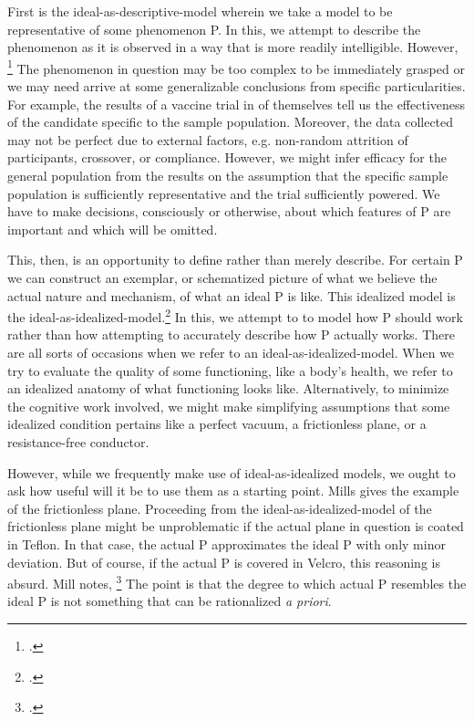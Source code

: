 \documentclass[letterpaper,notitlepage,12pt]{article}
\begin{document}
First is the ideal-as-descriptive-model wherein we take a model to be
representative of some phenomenon P.
In this, we attempt to describe the phenomenon as it is observed in a 
way that is more readily intelligible.
However, \footcite[p. 166]{mills_ideal_2005}
The phenomenon in question may be too complex to be immediately grasped or we
may need arrive at some generalizable conclusions from specific
particularities.
For example, the results of a vaccine trial in of themselves tell us the 
effectiveness of the candidate specific to the sample population.
Moreover, the data collected may not be perfect due to external factors, e.g.
non-random attrition of participants, crossover, or compliance.
However, we might infer efficacy for the general population from the results 
on the assumption that the specific sample population is sufficiently
representative and the trial sufficiently powered.
We have to make decisions, consciously or otherwise, about which 
features of P are important and which will be omitted. 

This, then, is an opportunity to define rather than merely describe.
For certain P we can construct an exemplar, or schematized picture of what we
believe the actual nature and mechanism, of what an ideal P is like.
This idealized model is the ideal-as-idealized-model.\footcite[p. 167
]{mills_ideal_2005}
In this, we attempt to to model how P should work rather than how attempting to
accurately describe how P actually works.
There are all sorts of occasions when we refer to an ideal-as-idealized-model.
When we try to evaluate the quality of some functioning, like a body's health,
we refer to an idealized anatomy of what  functioning looks
like.
Alternatively, to minimize the cognitive work involved, we might make
simplifying assumptions that some idealized condition pertains like a perfect
vacuum, a frictionless plane, or a resistance-free conductor.

However, while we frequently make use of ideal-as-idealized models, we ought to
ask how useful will it be to use them as a starting point.
Mills gives the example of the frictionless plane.
Proceeding from the ideal-as-idealized-model of the frictionless plane might be 
unproblematic if the actual plane in question is coated in Teflon.
In that case, the actual P approximates the ideal P with only minor deviation.
But of course, if the actual P is covered in Velcro, this reasoning is absurd.
Mill notes, \footcite[p. 167]{mills_ideal_2005}
The point is that the degree to which actual P resembles the ideal P is not
something that can be rationalized \textit{a priori}.
\end{document}
